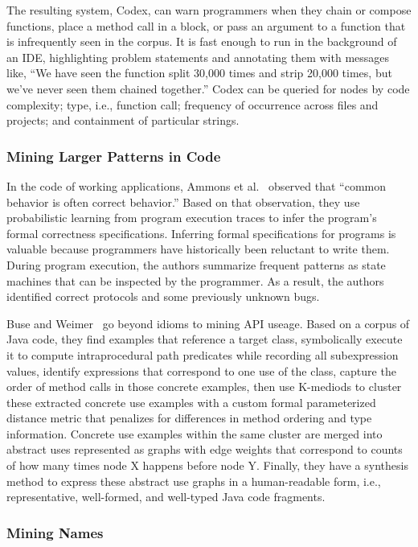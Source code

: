 The resulting system, Codex, can warn programmers when they chain or compose functions, place a method call in a block, or pass an argument to a function that is infrequently seen in the corpus. It is fast enough to run in the background of an IDE, highlighting problem statements and annotating them with messages like, ``We have seen the function split 30,000 times and strip 20,000 times, but we've never seen them chained together.'' Codex can be queried for nodes by code complexity; type, i.e., function call; frequency of occurrence across files and projects; and containment of particular strings.

\subsubsection{Mining Larger Patterns in Code}

In the code of working applications, Ammons et al.~\cite{ammons2002mining} observed that ``common behavior is often correct behavior.'' Based on that observation, they use probabilistic learning from program execution traces to infer the program’s formal correctness specifications. Inferring formal specifications for programs is valuable because programmers have historically been reluctant to write them. During program execution, the authors summarize frequent patterns as state machines that can be inspected by the programmer. As a result, the authors identified correct protocols and some previously unknown bugs.

Buse and Weimer~\cite{buse2012synthesizing} go beyond idioms to mining API useage. Based on a corpus of Java code, they find examples that reference a target class, symbolically execute it to compute intraprocedural path predicates while recording all subexpression values, identify expressions that correspond to one use of the class, capture the order of method calls in those concrete examples, then use K-mediods to cluster these extracted concrete use examples with a custom formal parameterized distance metric that penalizes for differences in method ordering and type information. Concrete use examples within the same cluster are merged into abstract uses represented as graphs with edge weights that correspond to counts of how many times node X happens before node Y. Finally, they have a synthesis method to express these abstract use graphs in a human-readable form, i.e., representative, well-formed, and well-typed Java code fragments.

\subsubsection{Mining Names}

